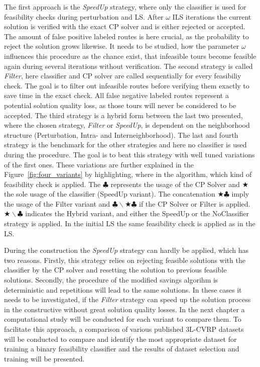 The first approach is the \textit{SpeedUp} strategy, where only the classifier is used for feasibility checks during perturbation and
\gls{LS}. After $\omega$ \gls{ILS} iterations the current solution is verified with the exact \gls{CP} solver and is either rejected or accepted.
The amount of false positive labeled routes is here crucial, as the probability to reject the solution grows likewise. It needs
to be studied, how the parameter $\omega$ influences this procedure as the chance exist, that infeasible tours become feasible
again during several iterations without verification.
The second strategy is called \textit{Filter}, here classifier and \gls{CP} solver are called sequentially for every
feasibiliy check. The goal is to filter out infeasible routes before verifying them exactly to save time in the exact check.
All false negative labeled routes represent a potential solution quality loss, as those tours will never be considered to be accepted.
The third strategy is a hybrid form between the last two presented, where the chosen strategy, \textit{Filter} or \textit{SpeedUp},
is dependent on the neighborhood structure (Perturbation, Intra- and Interneighborhood). The last and fourth strategy is the benchmark
for the other strategies and here no classifier is used during the procedure. The goal is to beat this strategy with well tuned
variations of the first ones. These variations are further explained in the Figure~\ref{fig:four_variants} by highlighting, where
in the algorithm, which kind of feasibility check is applied. The $\clubsuit$ represents the usage of the \gls{CP} Solver and
$\bigstar$ the sole usage of the classifier (SpeedUp variant). The concatenation $\bigstar\clubsuit$ imply the usage of the Filter
variant and \(\clubsuit \backslash \bigstar\clubsuit\) if the \gls{CP} Solver or Filter is applied. \(\bigstar\backslash\clubsuit\)
indicates the Hybrid variant, and either the SpeedUp or the NoClassifier strategy is applied. In the initial \gls{LS} the same
feasibility check is applied as in the \gls{LS}.



During the construction the \textit{SpeedUp} strategy can hardly be applied, which has two reasons. Firstly, this strategy relies
on rejecting feasible solutions with the classifier by the \gls{CP} solver and resetting the solution to previous feasible solutions.
Secondly, the procedure of the modified savings algorihm is deterministic and repetitions will lead to the same solutions. In these
cases it needs to be investigated, if the \textit{Filter} strategy can speed up the solution process in the constructive without
great solution quality losses. In the next chapter a computational study will be conducted for each variant to compare them. To facilitate this approach,
a comparison of various published \gls{3L-CVRP} datasets will be conducted to compare and identify the most appropriate
dataset for training a binary feasibility classifier and the results of dataset selection and training will be presented.

